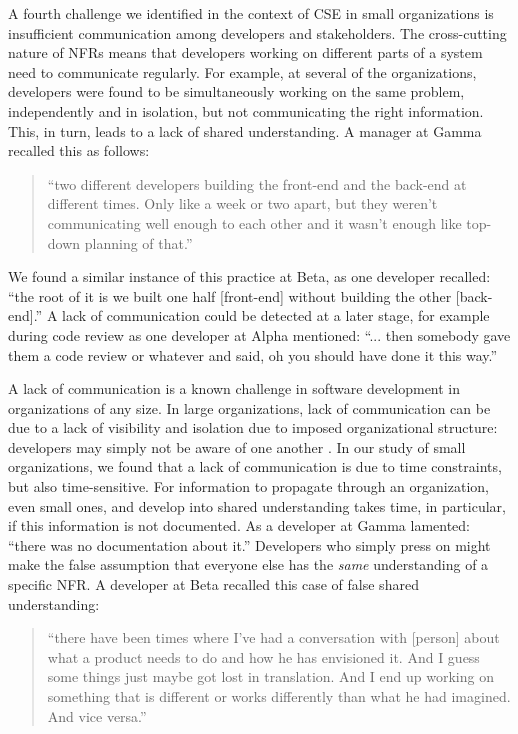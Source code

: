 \documentclass[smallextended]{svjour3}       %
\begin{document}
A fourth challenge we identified in the context of CSE in small organizations is insufficient communication among developers and stakeholders. The cross-cutting nature of NFRs means that developers working on different parts of a system need to communicate regularly. 
For example, at several of the organizations, developers were found to be simultaneously working on the same problem, independently and in isolation, but not communicating the right information. This, in turn, leads to a lack of shared understanding. 
A manager at Gamma recalled this as follows:
\begin{quote}
    ``two different developers building the front-end and the back-end at different times. Only like a week or two apart, but they weren't communicating well enough to each other and it wasn't enough like top-down planning of that.''
\end{quote}    
We found a similar instance of this practice at Beta, as one developer recalled:
\textmd{``the root of it is we built one half [front-end] without building the other [back-end].''}
A lack of communication could be detected at a later stage, for example during code review as one developer at Alpha mentioned:
\textmd{``... then somebody gave them a code review or whatever and said, oh you should have done it this way.''}


A lack of communication is a known challenge in software development in organizations of any size. 
In large organizations, lack of communication can be due to a lack of visibility and isolation due to imposed organizational structure: developers may simply not be aware of one another \citep{stol2014key}. In our study of small organizations, we found that a lack of communication is due to time constraints, but also time-sensitive. 
For information to propagate through an organization, even small ones, and develop into shared understanding takes time, in particular, if this information is not documented. As a developer at Gamma lamented:
\textmd{``there was no documentation about it.''}
Developers who simply press on might make the false assumption that everyone else has the \emph{same} understanding of a specific NFR. A developer at Beta recalled this case of false shared understanding:
\begin{quote}
    ``there have been times where I've had a conversation with [person] about what a product needs to do and how he has envisioned it. And I guess some things just maybe got lost in translation. And I end up working on something that is different or works differently than what he had imagined. And vice versa.''
\end{quote}    
  
\end{document}
